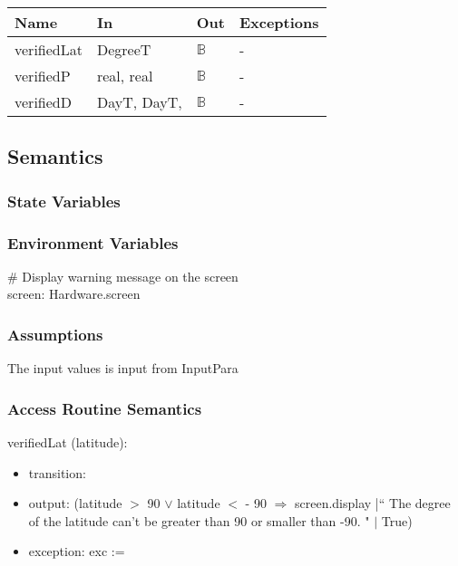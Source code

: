 \documentclass[12pt, titlepage]{article}
\begin{document}
\begin{center}
\begin{tabular}{p{2cm} p{5cm} p{2cm} p{5cm}}
\hline
\textbf{Name} & \textbf{In} & \textbf{Out} & \textbf{Exceptions} \\
\hline 
verifiedLat & DegreeT& $\mathbb{B}$ & - \\
verifiedP &  real, real & $\mathbb{B}$ & - \\
verifiedD & DayT, DayT, & $\mathbb{B}$ & - \\
\hline
\end{tabular}
\end{center}


\subsection{Semantics}

\subsubsection{State Variables}



\subsubsection{Environment Variables}
\# Display warning message on the screen\\
screen: Hardware.screen\\

\subsubsection{Assumptions}
The input values is input from InputPara


\subsubsection{ Access Routine Semantics}

\noindent  verifiedLat (latitude):
\begin{itemize}
\item transition: 
\item output: (latitude $>$ 90 $\lor$ latitude $<$ - 90 $\Rightarrow$ screen.display |`` The degree of the latitude can't be greater than 90 or smaller than -90. " $|$ True)
\item exception: exc := 
\end{itemize}
\end{document}
